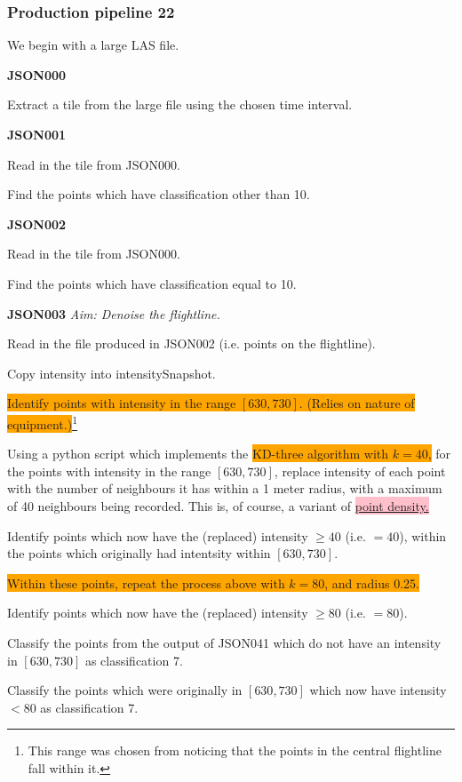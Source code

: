 \documentclass[a4paper,11pt,twoside]{article}
\theoremstyle{definition}
\theoremstyle{remark}
\newcommand{\sh}[1]{\colorbox{pink}{#1}}
\newcommand{\bad}[1]{\colorbox{orange}{#1}}
\begin{document}
\subsubsection{Production pipeline 22}
We begin with a large LAS file.
\begin{list}{}{}
\item \textbf{JSON000}
\item Extract a tile from the large file using the chosen time interval.
\item \textbf{JSON001}
\item Read in the tile from JSON000.
\item Find the points which have classification other than 10.
\item \textbf{JSON002}
\item Read in the tile from JSON000.
\item Find the points which have classification equal to 10.
\item \textbf{JSON003}
\emph{Aim: Denoise the flightline.}
\item Read in the file produced in JSON002 (i.e. points on the flightline).
\item Copy intensity into intensitySnapshot.
\item \bad{Identify points with intensity in the range $[630,730]$. (Relies on nature of equipment.)}\footnote{This range was chosen from noticing that the points in the central flightline fall within it.}
\item Using a python script which implements the \bad{KD-three algorithm with $k=40$,} for the points with intensity in the range $[630,730]$, replace intensity of each point with the number of neighbours it has within a 1 meter radius, with a maximum of 40 neighbours being recorded. This is, of course, a variant of \hyperref[crapptdens]{\sh{point density.}}
\item Identify points which now have the (replaced) intensity $\geqslant 40$ (i.e. $=40$), within the points which originally had intentsity within $[630,730]$.
\item \bad{Within these points, repeat the process above with $k=80$, and radius 0.25.}
\item Identify points which now have the (replaced) intensity $\geqslant 80$ (i.e. $=80$).
\item Classify the points from the output of JSON041 which do not have an intensity in $[630,730]$ as classification 7. 
\item Classify the points which were originally in $[630,730]$ which now have intensity $<80$ as classification 7.

\end{list}
\end{document}
